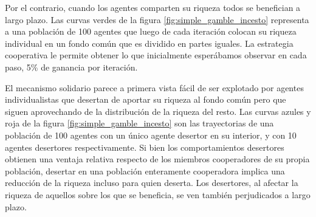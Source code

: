 \documentclass[a4paper,10pt]{book}
\theoremstyle{definition}
\begin{document}
Por el contrario, cuando los agentes comparten su riqueza todos se benefician a largo plazo.
Las curvas verdes de la figura \ref{fig:simple_gamble_incesto} representa a una población de 100 agentes que luego de cada iteración colocan su riqueza individual en un fondo común que es dividido en partes iguales.
La estrategia cooperativa le permite obtener lo que inicialmente esperábamos observar en cada paso, 5\% de ganancia por iteración.



El mecanismo solidario parece a primera vista fácil de ser explotado por agentes individualistas que desertan de aportar su riqueza al fondo común pero que siguen aprovechando de la distribución de la riqueza del resto.
Las curvas azules y roja de la figura \ref{fig:simple_gamble_incesto} son las trayectorias de una población de 100 agentes con un único agente desertor en su interior, y con 10 agentes desertores respectivamente.
Si bien los comportamientos desertores obtienen una ventaja relativa respecto de los miembros cooperadores de su propia población, desertar en una población enteramente cooperadora implica una reducción de la riqueza incluso para quien deserta.
Los desertores, al afectar la riqueza de aquellos sobre los que se beneficia, se ven también perjudicados a largo plazo.

\end{document}
